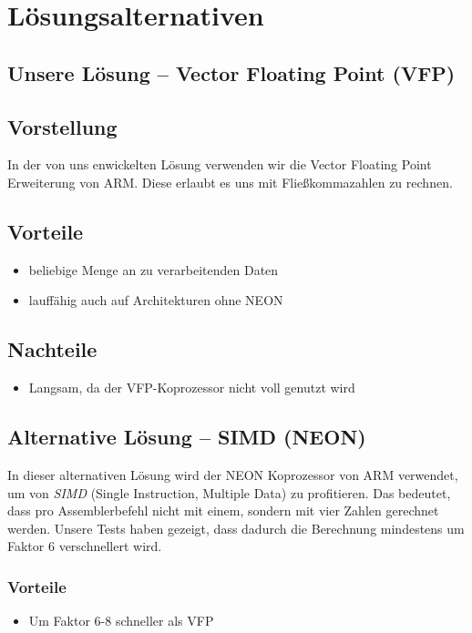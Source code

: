 \documentclass[11pt]{scrartcl}
\begin{document}
\section{Lösungsalternativen}
\subsection{Unsere Lösung -- Vector Floating Point (VFP)}
\subsection*{Vorstellung}
In der von uns enwickelten Lösung verwenden wir die Vector Floating Point Erweiterung von ARM. 
Diese erlaubt es uns mit Fließkommazahlen zu rechnen.
\subsection*{Vorteile}
\begin{itemize}
\item beliebige Menge an zu verarbeitenden Daten
\item lauffähig auch auf Architekturen ohne NEON
\end{itemize}
\subsection*{Nachteile}
\begin{itemize}
\item Langsam, da der VFP-Koprozessor nicht voll genutzt wird
\end{itemize}
\subsection{Alternative Lösung -- SIMD (NEON)}
In dieser alternativen Lösung wird der NEON Koprozessor von ARM verwendet, um von \emph{SIMD} (Single Instruction, Multiple Data)
zu profitieren. Das bedeutet, dass pro Assemblerbefehl nicht mit einem, sondern mit vier Zahlen gerechnet werden. Unsere Tests haben gezeigt, dass dadurch die Berechnung mindestens um Faktor 6 verschnellert wird.
\subsubsection{Vorteile}
\begin{itemize}
\item Um Faktor 6-8 schneller als VFP
\end{itemize}
\end{document}
